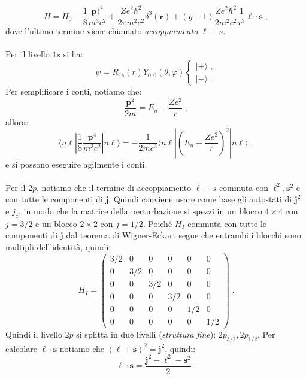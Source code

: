 \documentclass[12pt,a4paper]{report}
\theoremstyle{definition}
\numberwithin{equation}{section}
\newcommand{\bra}{\langle}
\newcommand{\ket}{\rangle}
\begin{document}
\begin{equation}
H=H_0-\frac{1}{8}\frac{\mathbf{p})^4}{m^3c^2}+\frac{Ze^2\hbar^2}{2\pi m^2c^2}\delta^3(\mathbf{r})+(g-1)\frac{Ze^2\hbar^2}{2m^2c^2}\frac{1}{r^3}\boldsymbol{\ell}\cdot\mathbf{s}\;,
\end{equation}
dove l'ultimo termine viene chiamato \textit{accoppiamento} $\ell-s$. \\
\\
Per il livello $1s$ si ha:
$$
\psi=R_{1s}(r)Y_{0,0}(\theta,\varphi)\begin{cases}
|+\ket\;, \\
|-\ket\;.
\end{cases}
$$
Per semplificare i conti, notiamo che:
\begin{equation*}
\frac{\mathbf{p}^2}{2m}=E_n+\frac{Ze^2}{r}\;,
\end{equation*}
allora:
\begin{equation}
\bra n\ell|\frac{1}{8}\frac{\mathbf{p}^4}{m^3c^2}|n\ell\ket=-\frac{1}{2mc^2}\bra n\ell|\left(E_n+\frac{Ze^2}{r}\right)^2|n\ell\ket\;,
\end{equation}
e si possono eseguire agilmente i conti. \\
\\
Per il $2p$, notiamo che il termine di accoppiamento $\ell-s$ commuta con $\boldsymbol{\ell}^2,\mathbf{s}^2$ e con tutte le componenti di $\mathbf{j}$. Quindi conviene usare come base gli autostati di $\mathbf{j}^2$ e $j_z$, in modo che la matrice della perturbazione si spezzi in un blocco $4\times 4$ con $j=3/2$ e un blocco $2\times 2$ con $j=1/2$. Poiché $H_I$ commuta con tutte le componenti di $\mathbf{j}$ dal teorema di Wigner-Eckart segue che entrambi i blocchi sono multipli dell'identità, quindi:
\begin{equation}
H_I=\left(\begin{matrix}
3/2 & 0 & 0 & 0 & 0 & 0 \\
0 & 3/2 & 0 & 0 & 0 & 0 \\
0 & 0 & 3/2 & 0 & 0 & 0 \\
0 & 0 & 0 & 3/2 & 0 & 0 \\
0 & 0 & 0 & 0 & 1/2 & 0 \\
0 & 0 & 0 & 0 & 0 & 1/2
\end{matrix}\right)\;.
\end{equation}
Quindi il livello $2p$ si splitta in due livelli (\textit{struttura fine}): $2p_{3/2},2p_{1/2}$. Per calcolare $\boldsymbol{\ell}\cdot\mathbf{s}$ notiamo che $(\boldsymbol{\ell}+\mathbf{s})^2=\mathbf{j}^2$, quindi:
\begin{equation}
\boldsymbol{\ell}\cdot\mathbf{s}=\frac{\mathbf{j}^2-\boldsymbol{\ell}^2-\mathbf{s}^2}{2}\;.
\end{equation}
\end{document}
